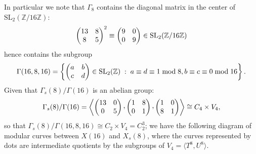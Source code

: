 \documentclass{amsart}
\newcommand{\ZZ}{\mathbb{Z}}
\newcommand{\SL}{\mathrm{SL}}
\newcommand{\isom}{\cong}
\newcommand{\ccomma}{\raisebox{0.4ex}{,}}
\begin{document}
\noindent
In particular we note that $\Gamma_8$ contains the diagonal matrix in the center
of $\SL_2(\ZZ/16\ZZ)$:
$$
\left(\begin{array}{@{}cc@{}}13&8\\8&5\end{array}\right)^2 \equiv
\left(\begin{array}{@{}cc@{}}9&0\\0&9\end{array}\right) \in \SL_2(\ZZ/16\ZZ)
$$
hence contains the subgroup
$$
\Gamma(16,8,16) = \left\{
  \left(\begin{array}{@{}cc@{}}a&b\\c&d\end{array}\right) \in \SL_2(\ZZ) \;:\;
  a \equiv d \equiv 1 \bmod 8, b \equiv c \equiv 0 \bmod 16 \right\}. 
$$
Given that $\Gamma_s(8)/\Gamma(16)$ is an abelian group:
$$
\Gamma_s(8)/\Gamma(16) =
\left\langle\left(\begin{array}{@{}cc@{}}13&0\\0&5\end{array}\right)\ccomma
\left(\begin{array}{@{}cc@{}}1&8\\0&1\end{array}\right)\ccomma
\left(\begin{array}{@{}cc@{}}1&0\\8&1\end{array}\right)
\right\rangle \isom C_4 \times V_4,
$$
so that $\Gamma_s(8)/\Gamma(16,8,16) \isom C_2 \times V_4 = C_2^3$; we have
the following diagram of modular curves between $X(16)$ and $X_s(8)$, where
the curves represented by dots %
are intermediate quotients by the subgroups of $V_4 = \langle{T^8,U^8}\rangle$.
\end{document}
